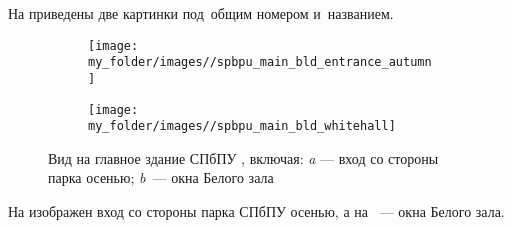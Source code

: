На  приведены две картинки под~общим номером и~названием.


\begin{figure}[!htbp]
	\begin{subfigure}[t]{\dimexpr.5\linewidth-1.3em\relax} %
		\texttt{[image: my\_folder/images//spbpu\_main\_bld\_entrance\_autumn]} %
	\end{subfigure}
	\begin{subfigure}[t]{\dimexpr.5\linewidth-1.3em\relax}%
		\texttt{[image: my\_folder/images//spbpu\_main\_bld\_whitehall]}%
	\end{subfigure}
\captionsetup{justification=centering} %
	\caption{Вид на главное здание СПбПУ \cite{spbpu-gallery}, включая: {\itshape a} --- вход со стороны парка осенью; {\itshape b}~--- окна Белого зала}\label{fig:spbpu_main_bld-two-photos}
\end{figure}

На  изображен вход со стороны парка СПбПУ осенью, а на ~--- окна Белого зала.

